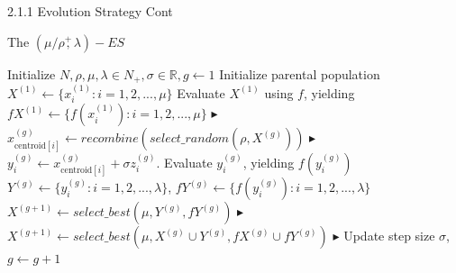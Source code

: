 \documentclass{beamer}
\begin{document}
\begin{frame}{2.1.1 Evolution Strategy Cont}
\begin{block}{The $(\mu/\rho\overset{+}{,}\lambda)-ES$}
 \footnotesize{
    \begin{algorithm}[H]
    \begin{algorithmic}[1]
        \STATE Initialize $N,\rho,\mu,\lambda \in N_+,\sigma \in \mathbb{R}, g \leftarrow 1$
        \STATE Initialize parental population $X^{(1)} \leftarrow \{x_i^{(1)}: i=1,2,...,\mu\}$
        \STATE Evaluate $X^{(1)}$ using $f$, yielding $fX^{(1)} \leftarrow \{ f(x_i^{(1)}): i=1,2,...,\mu \}$
        	    \hfill$\blacktriangleright$ %
        		\STATE $x_{\text{centroid}[i]}^{(g)} \leftarrow  recombine (select\_random (\rho,X^{(g)}))$  
        		    \hfill$\blacktriangleright$ %
        		\STATE $y_i^{(g)} \leftarrow x_{\text{centroid}[i]}^{(g)} + \sigma z_i^{(g)}$. Evaluate $y_i^{(g)}$, yielding $f(y_i^{(g)})$ 
        	\ENDFOR
        	\STATE $Y^{(g)} \leftarrow \{y_i^{(g)}: i=1,2,...,\lambda\}$,  $fY^{(g)} \leftarrow \{f(y_i^{(g)}): i=1,2,...,\lambda\}$
        		\STATE $X^{(g+1)} \leftarrow  select\_best
        		(\mu,Y^{(g)},fY^{(g)})$
        		    \hfill$\blacktriangleright$ %
        		\STATE $X^{(g+1)} \leftarrow  select\_best (\mu,X^{(g)} \cup Y^{(g)},fX^{(g)} \cup fY^{(g)})$
        		    \hfill$\blacktriangleright$ %
        	\ENDIF
        	\STATE Update step size $\sigma$, $g\leftarrow g+1$
        \ENDWHILE
    \end{algorithmic}
    \end{algorithm}
}
\end{block}
\end{frame}
\end{document}
